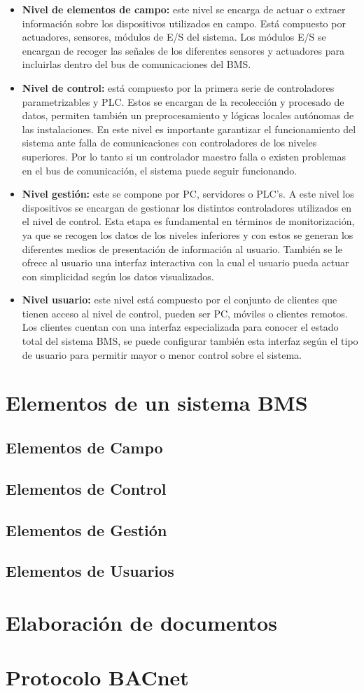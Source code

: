 \begin{itemize}
    \item \textbf{Nivel de elementos de campo:} 
    este nivel se encarga de actuar o extraer información sobre los dispositivos utilizados en campo. Está compuesto por actuadores, sensores, módulos de E/S del sistema. Los módulos E/S se encargan de recoger las señales de los diferentes sensores y actuadores para incluirlas dentro del bus de comunicaciones del BMS.
    \item \textbf{Nivel de control:}
     está compuesto por la primera serie de controladores parametrizables y PLC. Estos se encargan de la recolección y procesado de datos, permiten también un preprocesamiento y lógicas locales autónomas de las instalaciones. En este nivel es importante garantizar el funcionamiento del sistema ante falla de comunicaciones con controladores de los niveles superiores. Por lo tanto si un controlador maestro falla o existen problemas en el bus de comunicación, el sistema puede seguir funcionando.
     \item \textbf{Nivel gestión:}
     este se compone por PC, servidores o PLC's. A este nivel los dispositivos se encargan de gestionar los distintos controladores utilizados en el nivel de control. Esta etapa es fundamental en términos de monitorización, ya que se recogen los datos de los niveles inferiores y con estos se generan los diferentes medios de presentación de información al usuario. También se le ofrece al usuario una interfaz interactiva con la cual el usuario pueda actuar con simplicidad según los datos visualizados.
     \item \textbf{Nivel usuario:}
     este nivel está compuesto por el conjunto de clientes que tienen acceso al nivel de control, pueden ser PC, móviles o clientes remotos. Los clientes cuentan con una interfaz especializada para conocer el estado total del sistema BMS, se puede configurar también esta interfaz según el tipo de usuario para permitir mayor o menor control sobre el sistema. 
     
    
\end{itemize}

\section{Elementos de un sistema BMS}
\subsection{Elementos de Campo}
\subsection{Elementos de Control}
\subsection{Elementos de Gestión}
\subsection{Elementos de Usuarios}
\section{Elaboración de documentos}
\section{Protocolo BACnet}


